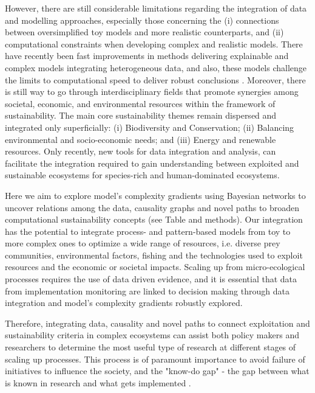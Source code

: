\documentclass[12pt,a4paper]{article}
\begin{document}
However, there are still considerable limitations regarding the integration of data and modelling approaches, especially those concerning the (i) connections between oversimplified toy models and more realistic counterparts, and (ii) computational constraints when developing complex and realistic models. There have recently been fast improvements in methods delivering explainable and complex models integrating heterogeneous data, and also, these models challenge the limits to computational speed to deliver robust conclusions \citep{rodrigues2014integrative}. Moreover, there is still way to go through interdisciplinary fields that promote synergies among societal, economic, and environmental resources within the framework of sustainability. The main core sustainability themes remain dispersed and integrated only superficially: (i) Biodiversity and Conservation; (ii) Balancing environmental and socio-economic needs; and (iii) Energy and renewable resources. Only recently, new tools for data integration and analysis, can facilitate the integration required to gain understanding between exploited and sustainable ecosystems for species-rich and human-dominated ecosystems.

Here we aim to explore model's complexity gradients using Bayesian networks to uncover relations among the data, causality graphs and novel paths to broaden computational sustainability concepts (see Table and methods). Our integration has the potential to integrate process- and pattern-based models from toy to more complex ones to optimize a wide range of resources, i.e. diverse prey communities, environmental factors, fishing and the technologies used to exploit resources and the economic or societal impacts. Scaling up from micro-ecological processes requires the use of data driven evidence, and it is essential that data from implementation monitoring are linked to decision making through data integration and model's complexity gradients robustly explored. 

Therefore, integrating data, causality and novel paths to connect exploitation and sustainability criteria in complex ecosystems can assist both policy makers and researchers to determine the most useful type of research at different stages of scaling up processes. This process is of paramount importance to avoid failure of initiatives to influence the society, and the "know-do gap" - the gap between what is known in research and what gets implemented \citep{catford2009advancing}. 
\end{document}
